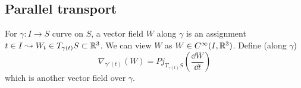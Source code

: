\subsection{Parallel transport}
For  $ \gamma:I\rightarrow S  $ curve on  $ S $, a vector field  $ W  $ along  $ \gamma $ is an assignment  $ t\in I\leadsto W_t\in T_{\gamma(t)}S\subset\mathbb R^3 $. We can view  $ W  $ as  $ W\in C^\infty(I,\mathbb R^3) $. Define  (along  $ \gamma $)
\[\nabla_{\gamma'(t)}(W)=Pj_{T_{\gamma(t)}S}\left(\frac{\dd W}{\dd t}\right)\] 
which is another vector field over  $ \gamma $.     
